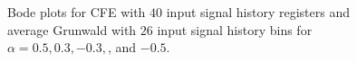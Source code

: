 \begin{figure}[ht!]
\begin{center}
{}
\end{center}
\label{fig:bode40_26}
\caption{Bode plots for CFE with $40$ input signal history registers
  and average Grunwald with $26$ input signal history
  bins for $\alpha=0.5, 0.3, -0.3,$, and $-0.5$. }

\end{figure}
